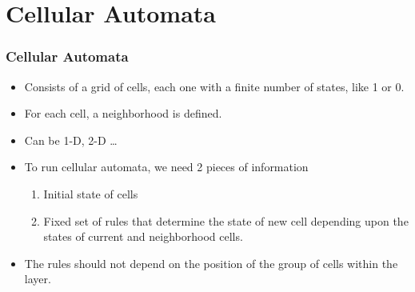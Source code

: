 \documentclass{beamer}
\begin{document}
\section{Cellular Automata}
\begin{frame}
    \frametitle{Cellular Automata}
    \begin{itemize}
        \item Consists of a grid of cells, each one with a finite number of states, like 1 or 0.
        \item For each cell, a neighborhood is defined.
        \item Can be 1-D, 2-D \dots
        \item To run cellular automata, we need 2 pieces of information 
        \begin{enumerate}
            \item Initial state of cells 
            \item Fixed set of rules that determine the state of new cell depending upon the states of current and neighborhood cells.
        \end{enumerate}
        \item The rules should not depend on the position of the group of cells within the layer.
    \end{itemize}
\end{frame}

\end{document}
